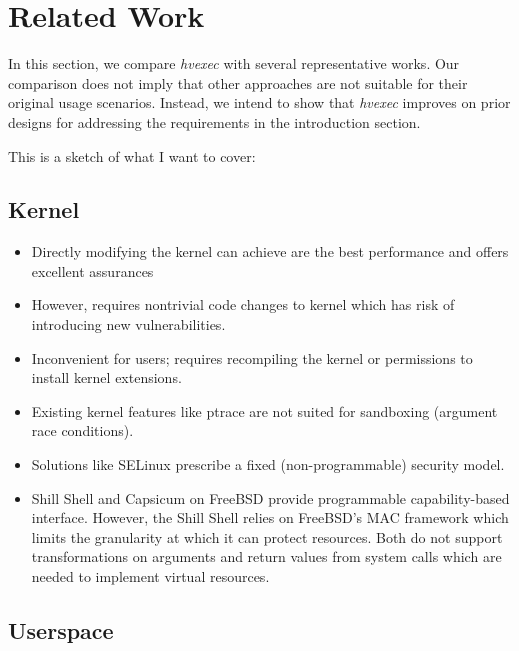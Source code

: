 \documentclass{article}
\newcommand{\PROJNAME}{\textit{hvexec}}
\begin{document}
\section{Related Work}
In this section, we compare \PROJNAME{} with several representative works.
Our comparison does not imply that other approaches are not suitable for their original usage scenarios.
Instead, we intend to show that \PROJNAME{} improves on prior designs for addressing the requirements in the introduction section.

This is a sketch of what I want to cover:
\subsection{Kernel}

\begin{itemize}
    \item
        Directly modifying the kernel can achieve are the best performance and offers excellent assurances
    \item
        However, requires nontrivial code changes to kernel which has risk of introducing new vulnerabilities.
    \item
        Inconvenient for users; requires recompiling the kernel or permissions to install kernel extensions.
    \item
        Existing kernel features like ptrace are not suited for sandboxing (argument race conditions).
    \item
        Solutions like SELinux prescribe a fixed (non-programmable) security model.
    \item
        Shill Shell and Capsicum on FreeBSD provide programmable capability-based interface. However, the Shill Shell relies on FreeBSD's MAC framework which limits the granularity at which it can protect resources. Both do not support transformations on arguments and return values from system calls which are needed to implement virtual resources.
\end{itemize}

\subsection{Userspace}
\end{document}
